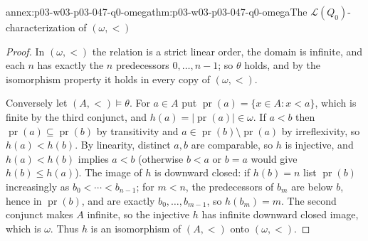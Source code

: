 \begin{annexitem}{annex:p03-w03-p03-047-q0-omega}{thm:p03-w03-p03-047-q0-omega}{The \(\mathscr L(Q_0)\)-characterization of \((\omega,<)\)}
\begin{proof}
In \((\omega,<)\) the relation is a strict linear order, the domain is
infinite, and each \(n\) has exactly the \(n\) predecessors
\(0,\ldots,n-1\); so \(\theta\) holds, and by the isomorphism property it
holds in every copy of \((\omega,<)\).

Conversely let \((A,<)\models\theta\).  For \(a\in A\) put
\(\operatorname{pr}(a)=\{x\in A:x<a\}\), which is finite by the third
conjunct, and \(h(a)=|\operatorname{pr}(a)|\in\omega\).  If \(a<b\) then
\(\operatorname{pr}(a)\subseteq\operatorname{pr}(b)\) by transitivity and
\(a\in\operatorname{pr}(b)\setminus\operatorname{pr}(a)\) by irreflexivity,
so \(h(a)<h(b)\).  By linearity, distinct \(a,b\) are comparable, so \(h\) is
injective, and \(h(a)<h(b)\) implies \(a<b\) (otherwise \(b<a\) or \(b=a\)
would give \(h(b)\le h(a)\)).  The image of \(h\) is downward closed: if
\(h(b)=n\) list \(\operatorname{pr}(b)\) increasingly as
\(b_0<\cdots<b_{n-1}\); for \(m<n\), the predecessors of \(b_m\) are below
\(b\), hence in \(\operatorname{pr}(b)\), and are exactly
\(b_0,\ldots,b_{m-1}\), so \(h(b_m)=m\).  The second conjunct makes \(A\)
infinite, so the injective \(h\) has infinite downward closed image, which is
\(\omega\).  Thus \(h\) is an isomorphism of \((A,<)\) onto \((\omega,<)\).
\end{proof}
\end{annexitem}

